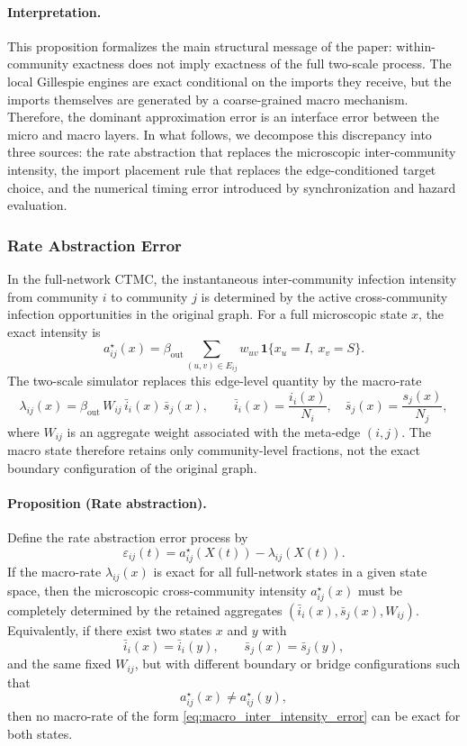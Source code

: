 \documentclass[a4paper,fleqn]{cas-sc}
\newcommand{\ReadStatusTwo}[5]{}
\begin{document}
\paragraph{Interpretation.}
This proposition formalizes the main structural message of the paper: within-community exactness does not imply exactness of the full two-scale process. 
The local Gillespie engines are exact conditional on the imports they receive, but the imports themselves are generated by a coarse-grained macro mechanism. 
Therefore, the dominant approximation error is an interface error between the micro and macro layers. In what follows, we decompose this discrepancy into three sources: the rate abstraction that replaces the microscopic inter-community intensity, the import placement rule that replaces the edge-conditioned target choice, and the numerical timing error introduced by synchronization and hazard evaluation.

\subsubsection{Rate Abstraction Error}
\ReadStatusTwo{Rate Abstraction Error}{Yulian}{1}{Michael}{0}

In the full-network CTMC, the instantaneous inter-community infection intensity from community \(i\) to community \(j\) is determined by the active cross-community infection opportunities in the original graph. For a full microscopic state \(x\), the exact intensity is
\begin{equation}
\label{eq:true_inter_intensity_error}
a^\star_{ij}(x)
=
\beta_{\mathrm{out}}\sum_{(u,v)\in E_{ij}}
w_{uv}\,\mathbf{1}\{x_u=I,\ x_v=S\}.
\end{equation}
The two-scale simulator replaces this edge-level quantity by the macro-rate
\begin{equation}
\label{eq:macro_inter_intensity_error}
\lambda_{ij}(x)
=
\beta_{\mathrm{out}}\, W_{ij}\,\bar{i}_i(x)\,\bar{s}_j(x),
\qquad
\bar{i}_i(x)=\frac{i_i(x)}{N_i},
\quad
\bar{s}_j(x)=\frac{s_j(x)}{N_j},
\end{equation}
where \(W_{ij}\) is an aggregate weight associated with the meta-edge \((i,j)\). The macro state therefore retains only community-level fractions, not the exact boundary configuration of the original graph.

\paragraph{Proposition (Rate abstraction).}
Define the rate abstraction error process by
\[
\varepsilon_{ij}(t)
=
a^\star_{ij}(X(t))-\lambda_{ij}(X(t)).
\]
If the macro-rate \(\lambda_{ij}(x)\) is exact for all full-network states in a given state space, then the microscopic cross-community intensity \(a^\star_{ij}(x)\) must be completely determined by the retained aggregates \((\bar{i}_i(x),\bar{s}_j(x),W_{ij})\). Equivalently, if there exist two states \(x\) and \(y\) with
\[
\bar{i}_i(x)=\bar{i}_i(y),\qquad
\bar{s}_j(x)=\bar{s}_j(y),
\]
and the same fixed \(W_{ij}\), but with different boundary or bridge configurations such that
\[
a^\star_{ij}(x)\neq a^\star_{ij}(y),
\]
then no macro-rate of the form \eqref{eq:macro_inter_intensity_error} can be exact for both states.
\end{document}
